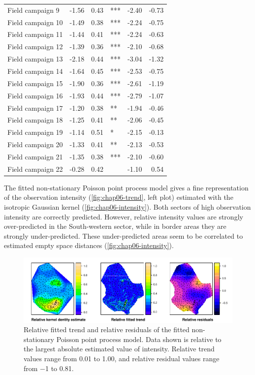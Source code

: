 \begin{table}[!ht]
\begin{tabular}{lrrlrr}
  Field campaign 9	& -1.56 	& 0.43 			& *** 	& -2.40 	& -0.73 \\ 
  Field campaign 10	& -1.49 	& 0.38 			& *** 	& -2.24 	& -0.75 \\ 
  Field campaign 11	& -1.44 	& 0.41 			& *** 	& -2.24 	& -0.63 \\ 
  Field campaign 12	& -1.39 	& 0.36 			& *** 	& -2.10 	& -0.68 \\ 
  Field campaign 13	& -2.18 	& 0.44 			& *** 	& -3.04 	& -1.32 \\ 
  Field campaign 14	& -1.64 	& 0.45 			& *** 	& -2.53 	& -0.75 \\ 
  Field campaign 15	& -1.90 	& 0.36 			& *** 	& -2.61 	& -1.19 \\ 
  Field campaign 16	& -1.93 	& 0.44 			& *** 	& -2.79 	& -1.07 \\ 
  Field campaign 17	& -1.20 	& 0.38 			& ** 	& -1.94 	& -0.46 \\ 
  Field campaign 18	& -1.25 	& 0.41			& ** 	& -2.06 	& -0.45 \\ 
  Field campaign 19	& -1.14 	& 0.51 			& * 	& -2.15 	& -0.13 \\ 
  Field campaign 20	& -1.33 	& 0.41 			& ** 	& -2.13 	& -0.53 \\ 
  Field campaign 21	& -1.35 	& 0.38 			& *** 	& -2.10 	& -0.60 \\ 
  Field campaign 22	& -0.28 	& 0.42 			&    	& -1.10 	& 0.54 	\\ 
  \hline
 \end{tabular}
\end{table}

The fitted non-stationary Poisson point process model gives a fine representation of the observation intensity 
(\autoref{fig:chap06-trend}, left plot) estimated with the isotropic Gaussian kernel 
(\autoref{fig:chap06-intensity}). Both sectors of high observation intensity are correctly predicted. However, 
relative intensity values are strongly over-predicted in the South-western sector, while in border areas they 
are strongly under-predicted. These under-predicted areas seem to be correlated to estimated empty space 
distances (\autoref{fig:chap06-intensity}).

\begin{figure}[!h]
 \centering
 \includegraphics{fig/chap06-kernel-trend-res}
 \caption{Relative fitted trend and relative residuals of the fitted non-stationary Poisson point process 
 model. Data shown is relative to the largest absolute estimated value of intensity. Relative trend values 
 range from \num{0.01} to \num{1.00}, and relative residual values range from \num{-1} to \num{0.81}.}
 \label{fig:chap06-trend}
\end{figure}

